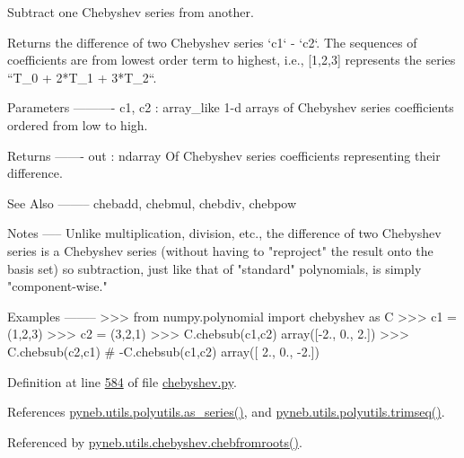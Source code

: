 \begin{DoxyVerb}Subtract one Chebyshev series from another.

Returns the difference of two Chebyshev series `c1` - `c2`.  The
sequences of coefficients are from lowest order term to highest, i.e.,
[1,2,3] represents the series ``T_0 + 2*T_1 + 3*T_2``.

Parameters
----------
c1, c2 : array_like
    1-d arrays of Chebyshev series coefficients ordered from low to
    high.

Returns
-------
out : ndarray
    Of Chebyshev series coefficients representing their difference.

See Also
--------
chebadd, chebmul, chebdiv, chebpow

Notes
-----
Unlike multiplication, division, etc., the difference of two Chebyshev
series is a Chebyshev series (without having to "reproject" the result
onto the basis set) so subtraction, just like that of "standard"
polynomials, is simply "component-wise."

Examples
--------
>>> from numpy.polynomial import chebyshev as C
>>> c1 = (1,2,3)
>>> c2 = (3,2,1)
>>> C.chebsub(c1,c2)
array([-2.,  0.,  2.])
>>> C.chebsub(c2,c1) # -C.chebsub(c1,c2)
array([ 2.,  0., -2.])\end{DoxyVerb}
 

Definition at line \hyperlink{chebyshev_8py_source_l00584}{584} of file \hyperlink{chebyshev_8py_source}{chebyshev.\-py}.



References \hyperlink{polyutils_8py_source_l00115}{pyneb.\-utils.\-polyutils.\-as\-\_\-series()}, and \hyperlink{polyutils_8py_source_l00085}{pyneb.\-utils.\-polyutils.\-trimseq()}.



Referenced by \hyperlink{chebyshev_8py_source_l00472}{pyneb.\-utils.\-chebyshev.\-chebfromroots()}.


